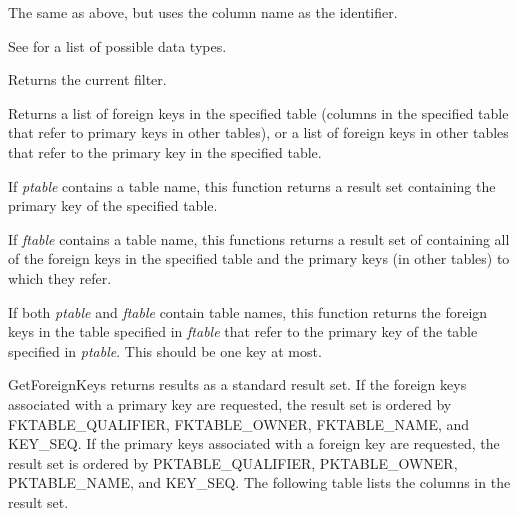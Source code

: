
The same as above, but uses the column name as the identifier.

See  for a list
of possible data types.



Returns the current filter.



Returns a list of foreign keys in the specified table (columns in the
specified table that refer to primary keys in other tables), or
a list of foreign keys in other tables that refer to the primary key in
the specified table.

If {\it ptable} contains a table name, this function returns a result
set containing the primary key of the specified table.

If {\it ftable} contains a table name, this functions returns a result set
of containing all of the foreign keys in the specified table and the
primary keys (in other tables) to which they refer.

If both {\it ptable} and {\it ftable} contain table names, this
function returns the foreign keys in the table specified in {\it
ftable} that refer to the primary key of the table specified in {\it
ptable}. This should be one key at most.

GetForeignKeys returns results as a standard result set. If the foreign
keys associated with a primary key are requested, the result set is
ordered by FKTABLE\_QUALIFIER, FKTABLE\_OWNER, FKTABLE\_NAME, and KEY\_SEQ.
If the primary keys associated with a foreign key are requested, the
result set is ordered by PKTABLE\_QUALIFIER, PKTABLE\_OWNER, PKTABLE\_NAME,
and KEY\_SEQ. The following table lists the columns in the result set. 

\begin{twocollist}\itemsep=0pt
\end{twocollist}

